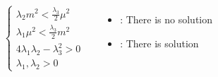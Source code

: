 \documentclass[10pt,xcolor=dvipsnames,mathserif]{beamer}
\newcommand{\xmark}{\ding{55}}%
\renewcommand{\(}{\left(}
\renewcommand{\)}{\right)}
\renewcommand{\[}{\left[}
\renewcommand{\]}{\right]}
\begin{document}

\begin{frame}
	
	\begin{columns}
		\begin{equation*}
		\begin{aligned}
		\begin{cases}
		\lambda_2 m^2 < \tfrac{\lambda_3}{2} \mu^2 \\
		\lambda_1 \mu^2 < \tfrac{\lambda_3}{2} m^2 \\
		4 \lambda_1 \lambda_2 - \lambda_3^2 >0 \\
		\lambda_1,\lambda_2 > 0
		\end{cases}	
		\end{aligned}
		\end{equation*}
		\begin{itemize}
			\item[] \xmark: There is no solution
			\item[] \checkmark: There is solution
		\end{itemize}
		
	\end{columns}
						

\end{frame}
\end{document}
